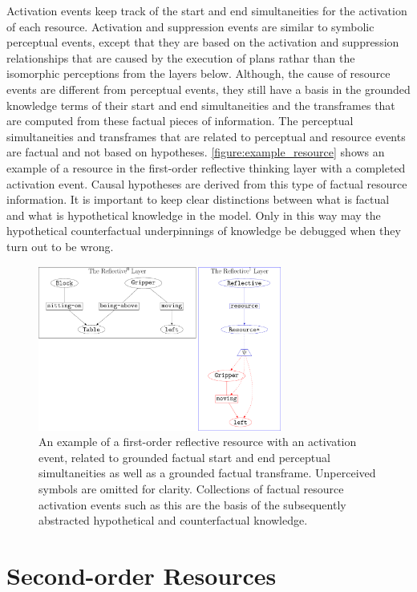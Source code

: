 Activation events keep track of the start and end simultaneities for
the activation of each resource.  Activation and suppression events
are similar to symbolic perceptual events, except that they are based
on the activation and suppression relationships that are caused by the
execution of plans rathar than the isomorphic perceptions from the
layers below.  Although, the cause of resource events are different
from perceptual events, they still have a basis in the grounded
knowledge terms of their start and end simultaneities and the
transframes that are computed from these factual pieces of
information.  The perceptual simultaneities and transframes that are
related to perceptual and resource events are factual and not based on
hypotheses.  {\mbox{\autoref{figure:example_resource}}} shows an
example of a resource in the first-order reflective thinking layer
with a completed activation event.  Causal hypotheses are derived from
this type of factual resource information.  It is important to keep
clear distinctions between what is factual and what is hypothetical
knowledge in the model.  Only in this way may the hypothetical
counterfactual underpinnings of knowledge be debugged when they turn
out to be wrong.
\begin{figure}
\center
\includegraphics[width=8cm]{gfx/example_resource}
\caption[An example of a first-order reflective resource with an
  activation event.]{An example of a first-order reflective resource
  with an activation event, related to grounded factual start and end
  perceptual simultaneities as well as a grounded factual transframe.
  Unperceived symbols are omitted for clarity.  Collections of factual
  resource activation events such as this are the basis of the
  subsequently abstracted hypothetical and counterfactual knowledge.}
\label{figure:example_resource}
\end{figure}

\section{Second-order Resources}


